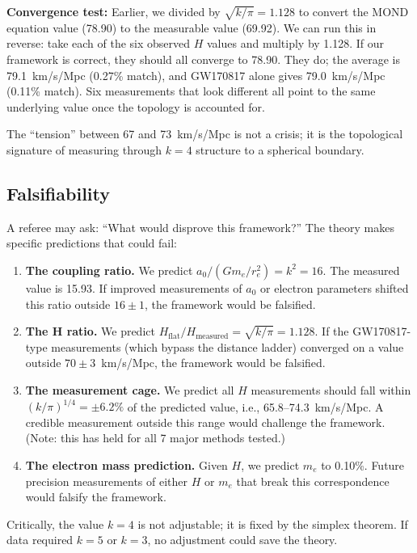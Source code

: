 \documentclass[aps,prd,preprint,superscriptaddress,showpacs,preprintnumbers,amsmath,amssymb,nofootinbib]{revtex4-2}
\begin{document}
\textbf{Convergence test:} Earlier, we divided by $\sqrt{k/\pi} = 1.128$ to convert the MOND equation value (78.90) to the measurable value (69.92). We can run this in reverse: take each of the six observed $H$ values and multiply by 1.128. If our framework is correct, they should all converge to 78.90. They do; the average is 79.1~km/s/Mpc (0.27\% match), and GW170817 alone gives 79.0~km/s/Mpc (0.11\% match). Six measurements that look different all point to the same underlying value once the topology is accounted for.

The ``tension'' between 67 and 73~km/s/Mpc is not a crisis; it is the topological signature of measuring through $k=4$ structure to a spherical boundary.

\subsection{Falsifiability}
\label{subsec:falsify}

A referee may ask: ``What would disprove this framework?'' The theory makes specific predictions that could fail:

\begin{enumerate}
\item \textbf{The coupling ratio.} We predict $a_0/(Gm_e/r_e^2) = k^2 = 16$. The measured value is 15.93. If improved measurements of $a_0$ or electron parameters shifted this ratio outside $16 \pm 1$, the framework would be falsified.

\item \textbf{The H ratio.} We predict $H_{\text{flat}}/H_{\text{measured}} = \sqrt{k/\pi} = 1.128$. If the GW170817-type measurements (which bypass the distance ladder) converged on a value outside $70 \pm 3$~km/s/Mpc, the framework would be falsified.

\item \textbf{The measurement cage.} We predict all $H$ measurements should fall within $(k/\pi)^{1/4} = \pm 6.2\%$ of the predicted value, i.e., 65.8--74.3~km/s/Mpc. A credible measurement outside this range would challenge the framework. (Note: this has held for all 7 major methods tested.)

\item \textbf{The electron mass prediction.} Given $H$, we predict $m_e$ to 0.10\%. Future precision measurements of either $H$ or $m_e$ that break this correspondence would falsify the framework.
\end{enumerate}

Critically, the value $k=4$ is not adjustable; it is fixed by the simplex theorem. If data required $k=5$ or $k=3$, no adjustment could save the theory.
\end{document}
